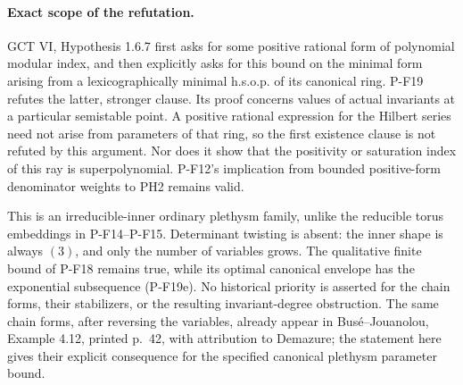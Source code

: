 \paragraph{Exact scope of the refutation.}
GCT VI, Hypothesis 1.6.7 first asks for some positive rational
form of polynomial modular index, and then explicitly asks for
this bound on the minimal form arising from a lexicographically
minimal h.s.o.p. of its canonical ring. P-F19 refutes the latter,
stronger clause. Its proof concerns values of actual invariants
at a particular semistable point. A positive rational expression
for the Hilbert series need not arise from parameters of that
ring, so the first existence clause is not refuted by this
argument. Nor does it show that the positivity or saturation
index of this ray is superpolynomial. P-F12's implication from
bounded positive-form denominator weights to PH2 remains valid.

This is an irreducible-inner ordinary plethysm family, unlike
the reducible torus embeddings in P-F14--P-F15. Determinant
twisting is absent: the inner shape is always $(3)$, and only
the number of variables grows. The qualitative finite bound
of P-F18 remains true, while its optimal canonical envelope
has the exponential subsequence (P-F19e). No historical
priority is asserted for the chain forms, their stabilizers,
or the resulting invariant-degree obstruction. The same chain
forms, after reversing the variables, already appear in
Bus\'e--Jouanolou, Example 4.12, printed p.~42, with attribution
to Demazure; the statement here gives their explicit consequence
for the specified canonical plethysm parameter bound.
